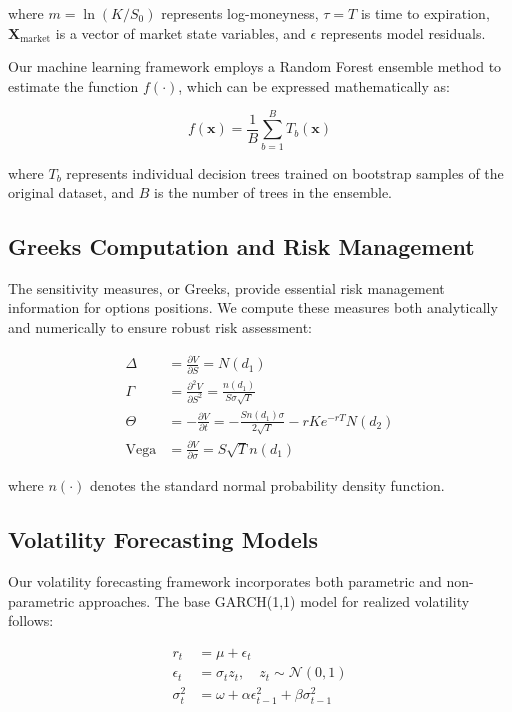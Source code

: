 \documentclass[12pt,a4paper]{article}
\begin{document}
where $m = \ln(K/S_0)$ represents log-moneyness, $\tau = T$ is time to expiration, $\mathbf{X}_{\text{market}}$ is a vector of market state variables, and $\epsilon$ represents model residuals.

Our machine learning framework employs a Random Forest ensemble method to estimate the function $f(\cdot)$, which can be expressed mathematically as:

\begin{equation}
f(\mathbf{x}) = \frac{1}{B}\sum_{b=1}^{B} T_b(\mathbf{x})
\label{eq:random_forest}
\end{equation}

where $T_b$ represents individual decision trees trained on bootstrap samples of the original dataset, and $B$ is the number of trees in the ensemble.

\subsection{Greeks Computation and Risk Management}

The sensitivity measures, or Greeks, provide essential risk management information for options positions. We compute these measures both analytically and numerically to ensure robust risk assessment:

\begin{align}
\Delta &= \frac{\partial V}{\partial S} = N(d_1) \label{eq:delta} \\
\Gamma &= \frac{\partial^2 V}{\partial S^2} = \frac{n(d_1)}{S\sigma\sqrt{T}} \label{eq:gamma} \\
\Theta &= -\frac{\partial V}{\partial t} = -\frac{Sn(d_1)\sigma}{2\sqrt{T}} - rKe^{-rT}N(d_2) \label{eq:theta} \\
\text{Vega} &= \frac{\partial V}{\partial \sigma} = S\sqrt{T}n(d_1) \label{eq:vega}
\end{align}

where $n(\cdot)$ denotes the standard normal probability density function.

\subsection{Volatility Forecasting Models}

Our volatility forecasting framework incorporates both parametric and non-parametric approaches. The base GARCH(1,1) model for realized volatility follows:

\begin{align}
r_t &= \mu + \epsilon_t \\
\epsilon_t &= \sigma_t z_t, \quad z_t \sim \mathcal{N}(0,1) \\
\sigma_t^2 &= \omega + \alpha \epsilon_{t-1}^2 + \beta \sigma_{t-1}^2
\label{eq:garch}
\end{align}
\end{document}
